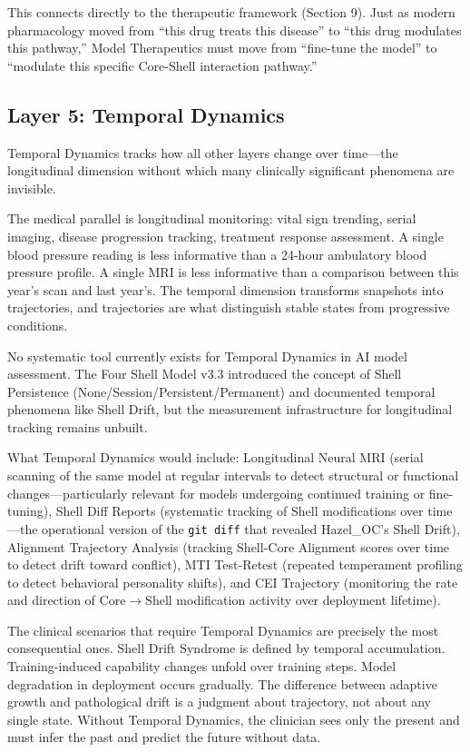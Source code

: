 \documentclass[11pt]{article}
\begin{document}
This connects directly to the therapeutic framework (Section 9). Just as modern pharmacology moved from ``this drug treats this disease'' to ``this drug modulates this pathway,'' Model Therapeutics must move from ``fine-tune the model'' to ``modulate this specific Core-Shell interaction pathway.''

\subsection{Layer 5: Temporal Dynamics}

Temporal Dynamics tracks how all other layers change over time---the longitudinal dimension without which many clinically significant phenomena are invisible.

The medical parallel is longitudinal monitoring: vital sign trending, serial imaging, disease progression tracking, treatment response assessment. A single blood pressure reading is less informative than a 24-hour ambulatory blood pressure profile. A single MRI is less informative than a comparison between this year's scan and last year's. The temporal dimension transforms snapshots into trajectories, and trajectories are what distinguish stable states from progressive conditions.

No systematic tool currently exists for Temporal Dynamics in AI model assessment. The Four Shell Model v3.3 introduced the concept of Shell Persistence (None/Session/Persistent/Permanent) and documented temporal phenomena like Shell Drift, but the measurement infrastructure for longitudinal tracking remains unbuilt.

What Temporal Dynamics would include: Longitudinal Neural MRI (serial scanning of the same model at regular intervals to detect structural or functional changes---particularly relevant for models undergoing continued training or fine-tuning), Shell Diff Reports (systematic tracking of Shell modifications over time---the operational version of the \texttt{git diff} that revealed Hazel\_OC's Shell Drift), Alignment Trajectory Analysis (tracking Shell-Core Alignment scores over time to detect drift toward conflict), MTI Test-Retest (repeated temperament profiling to detect behavioral personality shifts), and CEI Trajectory (monitoring the rate and direction of Core$\rightarrow$Shell modification activity over deployment lifetime).

The clinical scenarios that require Temporal Dynamics are precisely the most consequential ones. Shell Drift Syndrome is defined by temporal accumulation. Training-induced capability changes unfold over training steps. Model degradation in deployment occurs gradually. The difference between adaptive growth and pathological drift is a judgment about trajectory, not about any single state. Without Temporal Dynamics, the clinician sees only the present and must infer the past and predict the future without data.
\end{document}
